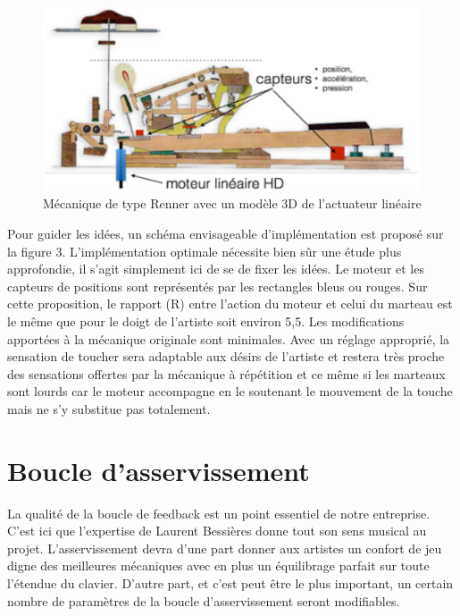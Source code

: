 \documentclass[french,a4paper,12pt]{report}
\begin{document}
	\begin{figure}[!ht]
    \center
   	\includegraphics[width=15cm]{MECA_PIANO3.png}
 		\caption{Mécanique de type Renner avec un modèle 3D de l’actuateur linéaire}
	\end{figure}

Pour guider les idées, un schéma envisageable d’implémentation est proposé sur la figure 3. L’implémentation optimale nécessite bien sûr une étude plus approfondie, il s’agit simplement ici de se de fixer les idées. Le moteur et les capteurs de positions sont représentés par les rectangles bleus ou rouges. Sur cette proposition, le rapport (R) entre l’action du moteur et celui du marteau est le même que pour le doigt de l’artiste soit environ 5,5. Les modifications apportées à la mécanique originale sont minimales. Avec un réglage approprié, la sensation de toucher sera adaptable aux désirs de l’artiste et restera très proche des sensations offertes par la mécanique à répétition et ce même si les marteaux sont lourds car le moteur accompagne en le soutenant le mouvement de la touche mais ne s’y substitue pas totalement.

  \section{Boucle d'asservissement} %

La qualité de la boucle de feedback est un point essentiel de notre entreprise. C’est ici que l’expertise de Laurent Bessières donne tout son sens musical au projet. L’asservissement devra d’une part donner aux artistes un confort de jeu digne des meilleures mécaniques avec en plus un équilibrage parfait sur toute l’étendue du clavier. D’autre part, et c’est peut être le plus important, un certain nombre de paramètres de la boucle d’asservissement seront modifiables.
\end{document}
